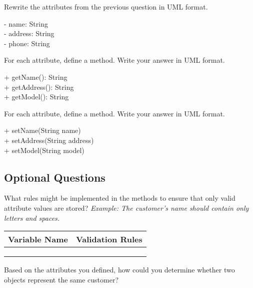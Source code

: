 \Q Rewrite the attributes from the previous question in UML format.

\begin{answer}
- name: String \\
- address: String \\
- phone: String
\end{answer}


\Q \label{key2}
For each attribute, define a  method. Write your answer in UML format.

\begin{answer}
+ getName(): String \\
+ getAddress(): String \\
+ getModel(): String
\end{answer}


\Q \label{key3}
For each attribute, define a  method. Write your answer in UML format.

\begin{answer}
+ setName(String name) \\
+ setAddress(String address) \\
+ setModel(String model)
\end{answer}


\vfill
\subsection*{Optional Questions}


\Q What rules might be implemented in the  methods to ensure that only valid attribute values are stored?
\textit{Example: The customer's name should contain only letters and spaces.}

\begin{center}
\begin{tabularx}{38.5em}{L{8.5em}|X}
Variable Name       & Validation Rules                                               \\
\hline
{}     &   \\
  &   \\
    &    \\
\end{tabularx}
\end{center}


\Q Based on the attributes you defined, how could you determine whether two  objects represent the same customer?


